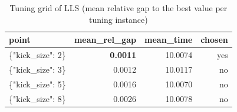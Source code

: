 \begin{table}[htbp]
\centering
\small
\caption{Tuning grid of LLS (mean relative gap to the best value per tuning instance)}
\label{tab:E8b_tuning_budget_LLS}
\begin{tabular}{lrrr}
\toprule
point & mean\_rel\_gap & mean\_time & chosen \\
\midrule
\{"kick\_size": 2\} & \textbf{0.0011} & 10.0074 & yes \\
\{"kick\_size": 3\} & 0.0012 & 10.0117 & no \\
\{"kick\_size": 5\} & 0.0016 & 10.0070 & no \\
\{"kick\_size": 8\} & 0.0026 & 10.0078 & no \\
\bottomrule
\end{tabular}
\end{table}
